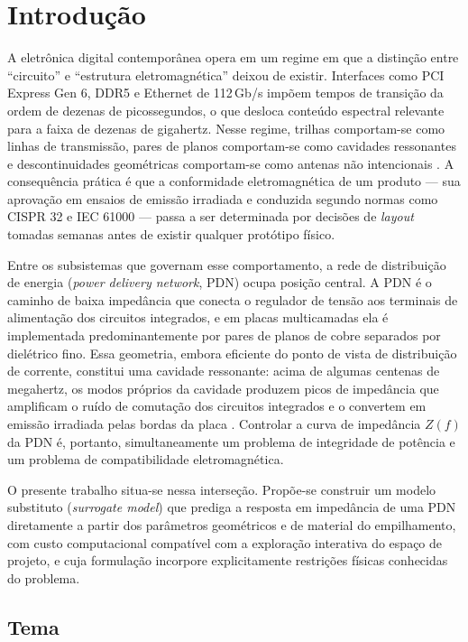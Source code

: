 \chapter{Introdução}
\label{cap:introducao}

A eletrônica digital contemporânea opera em um regime em que a distinção entre
``circuito'' e ``estrutura eletromagnética'' deixou de existir. Interfaces como
PCI Express Gen 6, DDR5 e Ethernet de 112\,Gb/s impõem tempos de transição da
ordem de dezenas de picossegundos, o que desloca conteúdo espectral relevante
para a faixa de dezenas de gigahertz. Nesse regime, trilhas comportam-se como
linhas de transmissão, pares de planos comportam-se como cavidades ressonantes e
descontinuidades geométricas comportam-se como antenas não intencionais
\citep{swaminathan2020,hillebrecht2024}. A consequência prática é que a
conformidade eletromagnética de um produto — sua aprovação em ensaios de emissão
irradiada e conduzida segundo normas como CISPR 32 e IEC 61000 — passa a ser
determinada por decisões de \textit{layout} tomadas semanas antes de existir
qualquer protótipo físico.

Entre os subsistemas que governam esse comportamento, a rede de distribuição de
energia (\textit{power delivery network}, PDN) ocupa posição central. A PDN é o
caminho de baixa impedância que conecta o regulador de tensão aos terminais de
alimentação dos circuitos integrados, e em placas multicamadas ela é implementada
predominantemente por pares de planos de cobre separados por dielétrico fino.
Essa geometria, embora eficiente do ponto de vista de distribuição de corrente,
constitui uma cavidade ressonante: acima de algumas centenas de megahertz, os
modos próprios da cavidade produzem picos de impedância que amplificam o ruído de
comutação dos circuitos integrados e o convertem em emissão irradiada pelas
bordas da placa \citep{swaminathan2020}. Controlar a curva de impedância $Z(f)$
da PDN é, portanto, simultaneamente um problema de integridade de potência e um
problema de compatibilidade eletromagnética.

O presente trabalho situa-se nessa interseção. Propõe-se construir um modelo
substituto (\textit{surrogate model}) que prediga a resposta em impedância de
uma PDN diretamente a partir dos parâmetros geométricos e de material do
empilhamento, com custo computacional compatível com a exploração interativa do
espaço de projeto, e cuja formulação incorpore explicitamente restrições físicas
conhecidas do problema.

\section{Tema}
\label{sec:tema}


